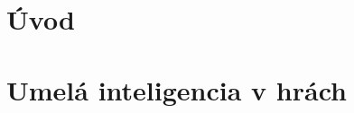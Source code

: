 \documentclass[slovak, master]{diploma}
\begin{document}
\MakeTitlePages

\listoffigures
\clearpage

\listoftables
\clearpage

\lstlistoflistings
\clearpage

\chapter{Úvod}
\label{sec:Introduction}


\chapter{Umelá inteligencia v hrách}
\label{sec:AI in games}
\end{document}
